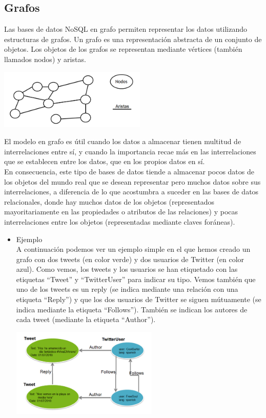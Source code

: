 \documentclass[twoside,twocolumn]{article}
\begin{document}
\subsection{Grafos}

Las bases de datos NoSQL en grafo permiten representar los datos utilizando estructuras de grafos. Un grafo es una representación abstracta de un conjunto de objetos. Los objetos de los grafos se representan mediante vértices (también llamados nodos) y aristas.

\begin{center}
	\includegraphics[width=7cm]{./Imagenes/nodos_aristas} 
\end{center}

El modelo en grafo es útil cuando los datos a almacenar tienen multitud de interrelaciones entre sí, y cuando la importancia recae más en las interrelaciones que se establecen entre los datos, que en los propios datos en sí. 
\\
En consecuencia, este tipo de bases de datos tiende a almacenar pocos datos de los objetos del mundo real que se desean representar pero muchos datos sobre sus interrelaciones, a diferencia de lo que acostumbra a suceder en las bases de datos relacionales, donde hay muchos datos de los objetos (representados mayoritariamente en las propiedades o atributos de las relaciones) y pocas interrelaciones entre los objetos (representadas mediante claves foráneas). 


\begin{itemize}
\item Ejemplo
\\ A continuación podemos ver un ejemplo simple en el que hemos creado un grafo con dos tweets (en color verde) y dos usuarios de Twitter (en color azul). Como vemos, los tweets y los usuarios se han etiquetado con las etiquetas “Tweet” y “TwitterUser” para indicar su tipo. Vemos también que uno de los tweets es un reply (se indica mediante una relación con una etiqueta “Reply”) y que los dos usuarios de Twitter se siguen mútuamente (se indica mediante la etiqueta “Follows”). También se indican los autores de cada tweet (mediante la etiqueta “Author”).


\begin{center}
	\includegraphics[width=7cm]{./Imagenes/tweet} 
\end{center}

\end{itemize} 
\end{document}
